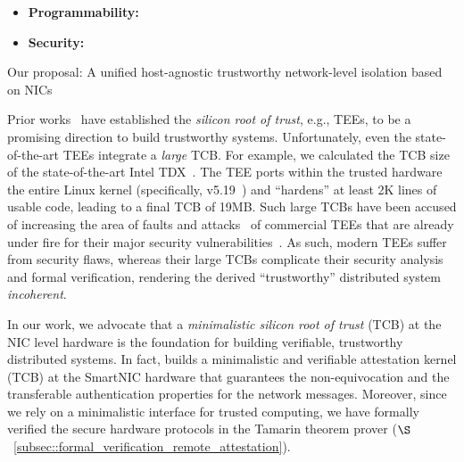 

\begin{itemize}
    \item {\bf Programmability:}

    \item {\bf Security:}
\end{itemize}

Our proposal: A unified host-agnostic trustworthy network-level isolation based on NICs
\fi 


 Prior works~\cite{avocado, minBFT, hybster, 10.1145/3492321.3519568} have established the {\em silicon root of trust}, e.g., TEEs, to be a promising direction to build trustworthy systems. Unfortunately, even the state-of-the-art TEEs integrate a {\em large} TCB. For example, we calculated the TCB size of the state-of-the-art Intel TDX~\cite{intelTDX}. The TEE ports within the trusted hardware the entire Linux kernel (specifically, v5.19~\cite{linuxlifecircle}) and ``hardens'' at least 2K lines of usable code, leading to a final TCB of 19MB. Such large TCBs have been accused of increasing the area of faults and attacks~\cite{10.1145/3379469, 10.5555/1756748.1756832} of commercial TEEs that are already under fire for their {major security vulnerabilities}~\cite{intel_sgx_vulnerabilities1, intel_sgx_vulnerabilities2, intel_sgx_vulnerabilities3, intel_sgx_vulnerabilities4, intel_sgx_vulnerabilities5}. As such, modern TEEs suffer from security flaws, whereas their large TCBs complicate their {security analysis and formal verification}, rendering the derived ``trustworthy'' distributed system {\em incoherent}. 


 In our work, we advocate that a {\em minimalistic silicon root of trust} (TCB) at the NIC level hardware is the foundation for building verifiable, trustworthy distributed systems. In fact, \projecttitle{} builds a minimalistic and verifiable attestation kernel (TCB) at the SmartNIC hardware that guarantees the non-equivocation and the transferable authentication properties for the network messages. Moreover, since we rely on a minimalistic interface for trusted computing, we have formally verified the \projecttitle{} secure hardware protocols in the Tamarin theorem prover ($\S$~\ref{subsec::formal_verification_remote_attestation}).

